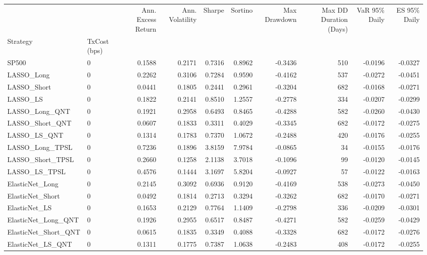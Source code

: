 \begin{tabular}{llrrrrrrrr}
\toprule
 &  & Ann. Excess Return & Ann. Volatility & Sharpe & Sortino & Max Drawdown & Max DD Duration (Days) & VaR 95\% Daily & ES 95\% Daily \\
Strategy & TxCost (bps) &  &  &  &  &  &  &  &  \\
\midrule
SP500 & 0 & 0.1588 & 0.2171 & 0.7316 & 0.8962 & -0.3436 & 510 & -0.0196 & -0.0327 \\
\cline{1-10}
LASSO\_Long & 0 & 0.2262 & 0.3106 & 0.7284 & 0.9590 & -0.4162 & 537 & -0.0272 & -0.0451 \\
\cline{1-10}
LASSO\_Short & 0 & 0.0441 & 0.1805 & 0.2441 & 0.2961 & -0.3204 & 682 & -0.0168 & -0.0271 \\
\cline{1-10}
LASSO\_LS & 0 & 0.1822 & 0.2141 & 0.8510 & 1.2557 & -0.2778 & 334 & -0.0207 & -0.0299 \\
\cline{1-10}
LASSO\_Long\_QNT & 0 & 0.1921 & 0.2958 & 0.6493 & 0.8465 & -0.4288 & 582 & -0.0260 & -0.0430 \\
\cline{1-10}
LASSO\_Short\_QNT & 0 & 0.0607 & 0.1833 & 0.3311 & 0.4029 & -0.3345 & 682 & -0.0172 & -0.0275 \\
\cline{1-10}
LASSO\_LS\_QNT & 0 & 0.1314 & 0.1783 & 0.7370 & 1.0672 & -0.2488 & 420 & -0.0176 & -0.0255 \\
\cline{1-10}
LASSO\_Long\_TPSL & 0 & 0.7236 & 0.1896 & 3.8159 & 7.9784 & -0.0865 & 34 & -0.0155 & -0.0176 \\
\cline{1-10}
LASSO\_Short\_TPSL & 0 & 0.2660 & 0.1258 & 2.1138 & 3.7018 & -0.1096 & 99 & -0.0120 & -0.0145 \\
\cline{1-10}
LASSO\_LS\_TPSL & 0 & 0.4576 & 0.1444 & 3.1697 & 5.8204 & -0.0927 & 57 & -0.0122 & -0.0163 \\
\cline{1-10}
ElasticNet\_Long & 0 & 0.2145 & 0.3092 & 0.6936 & 0.9120 & -0.4169 & 538 & -0.0273 & -0.0450 \\
\cline{1-10}
ElasticNet\_Short & 0 & 0.0492 & 0.1814 & 0.2713 & 0.3294 & -0.3262 & 682 & -0.0170 & -0.0271 \\
\cline{1-10}
ElasticNet\_LS & 0 & 0.1653 & 0.2129 & 0.7764 & 1.1409 & -0.2798 & 336 & -0.0209 & -0.0301 \\
\cline{1-10}
ElasticNet\_Long\_QNT & 0 & 0.1926 & 0.2955 & 0.6517 & 0.8487 & -0.4271 & 582 & -0.0259 & -0.0429 \\
\cline{1-10}
ElasticNet\_Short\_QNT & 0 & 0.0615 & 0.1835 & 0.3349 & 0.4088 & -0.3328 & 682 & -0.0172 & -0.0276 \\
\cline{1-10}
ElasticNet\_LS\_QNT & 0 & 0.1311 & 0.1775 & 0.7387 & 1.0638 & -0.2483 & 408 & -0.0172 & -0.0255 \\

\end{tabular}
